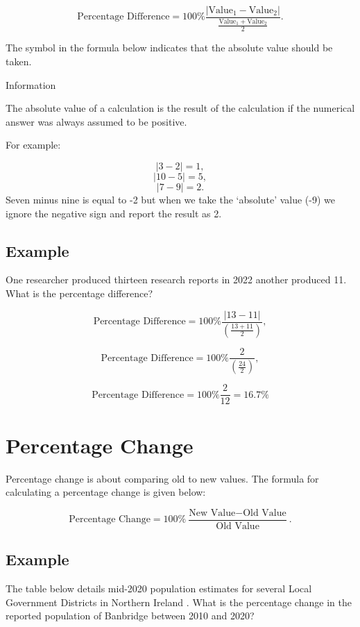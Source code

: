\documentclass[
]{book}
\begin{document}
\[ \textrm{Percentage Difference} = 100\% \frac{|\textrm{Value}_1 - \textrm{Value}_2|}{\frac{\textrm{Value}_1+\textrm{Value}_2}{2}}.\]

The \textbar{} symbol in the formula below indicates that the absolute value should be taken.

Information

The absolute value of a calculation is the result of the calculation if the numerical answer was always assumed to be positive.

For example:

\[ |3 - 2| = 1,\]
\[ |10 - 5| = 5,\]
\[ |7 - 9| = 2.\]
Seven minus nine is equal to -2 but when we take the `absolute' value (-9\textbar) we ignore the negative sign and report the result as 2.

\hypertarget{example-11}{%
\subsection{Example}\label{example-11}}

One researcher produced thirteen research reports in 2022 another produced 11. What is the percentage difference?

\[ \textrm{Percentage Difference} = 100\% \frac{|13 - 11|}{(\frac{13+11}{2})},\]

\[ \textrm{Percentage Difference} = 100\% \frac{2}{(\frac{24}{2})},\]

\[ \textrm{Percentage Difference} = 100\% \frac{2}{12} = 16.7\%\]

\hypertarget{percentage-change}{%
\section{Percentage Change}\label{percentage-change}}

Percentage change is about comparing old to new values. The formula for calculating a percentage change is given below:

\[ \textrm{Percentage Change} = 100\% \frac{\textrm{New Value} - \textrm{Old Value}}{\textrm{Old Value}}.\]

\hypertarget{example-12}{%
\subsection{Example}\label{example-12}}

The table below details mid-2020 population estimates for several Local Government Districts in Northern Ireland \citep{nisra14}. What is the percentage change in the reported population of Banbridge between 2010 and 2020?
\end{document}
